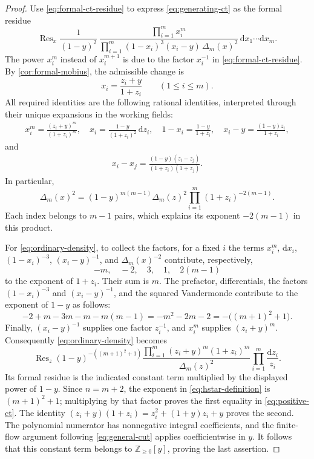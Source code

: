 \documentclass[reqno, 12pt]{article}
\numberwithin{equation}{section}
\theoremstyle{definition}
\DeclareMathOperator{\Res}{Res}
\newcommand{\dd}{\mathrm d}
\begin{document}
\begin{proof}
Use \eqref{eq:formal-ct-residue} to express
\eqref{eq:generating-ct} as the formal residue
\begin{equation}\label{eq:ordinary-density}
\Res_x\frac1{(1-y)^2}\,\frac{\prod_{i=1}^m x_i^m}{\prod_{i=1}^m(1-x_i)^3(x_i-y)\,\Delta_m(x)^2}\,\dd x_1\cdots\dd x_m.
\end{equation}
The power $x_i^m$ instead of $x_i^{m+1}$ is due to the factor
$x_i^{-1}$ in \eqref{eq:formal-ct-residue}.
By \cref{cor:formal-mobius}, the admissible change is
\begin{equation}\label{eq:mobius-substitution}
x_i=\frac{z_i+y}{1+z_i}\qquad(1\leq i\leq m).
\end{equation}
All required identities are the following rational identities,
interpreted through their unique expansions in the working fields:
\begin{align*}
x_i^m=\frac{(z_i+y)^m}{(1+z_i)^m},\quad x_i=\frac{1-y}{(1+z_i)^2}\,\dd z_i,\quad
1-x_i=\frac{1-y}{1+z_i},\quad
x_i-y=\frac{(1-y)z_i}{1+z_i},
\end{align*}
and 
\begin{align*}
x_i-x_j=\frac{(1-y)(z_i-z_j)}{(1+z_i)(1+z_j)}.
\end{align*}
In particular,
\[
\Delta_m(x)^2
 =(1-y)^{m(m-1)}\Delta_m(z)^2
       \prod_{i=1}^m(1+z_i)^{-2(m-1)}.
\]
Each index belongs to $m-1$ pairs, which explains its exponent
$-2(m-1)$ in this product.

For \eqref{eq:ordinary-density}, to collect the factors, for a fixed $i$ the terms $x_i^m$, $\dd x_i$,
$(1-x_i)^{-3}$, $(x_i-y)^{-1}$, and $\Delta_m(x)^{-2}$
contribute, respectively,
\[
-m,\quad -2,\quad 3,\quad 1,\quad 2(m-1)
\]
to the exponent of $1+z_i$.  Their sum is $m$.  The prefactor, differentials, the factors $(1-x_i)^{-3}$ and
$(x_i-y)^{-1}$, and the squared Vandermonde contribute to the
exponent of $1-y$ as follows:
\[
-2+m-3m-m-m(m-1)
 =-m^2-2m-2=-\bigl((m+1)^2+1\bigr).
\]
Finally, $(x_i-y)^{-1}$ supplies one factor $z_i^{-1}$,
and $x_i^m$ supplies $(z_i+y)^m$.  Consequently
\eqref{eq:ordinary-density} becomes
\[\Res_z (1-y)^{-((m+1)^2+1)}\frac{\prod_{i=1}^m(z_i+y)^m(1+z_i)^m}{\Delta_m(z)^2}\prod_{i=1}^m\frac{\dd z_i}{z_i}.
\]
Its formal residue is the indicated constant term multiplied
by the displayed power of $1-y$.
Since $n=m+2$, the exponent in
\eqref{eq:hstar-definition} is $(m+1)^2+1$; multiplying by
that factor proves the first equality in
\eqref{eq:positive-ct}.  The identity
$(z_i+y)(1+z_i)=z_i^2+(1+y)z_i+y$ proves the second.
The polynomial numerator has nonnegative integral coefficients, and the finite-flow argument following \eqref{eq:general-cut} applies coefficientwise in $y$. It follows that this constant term belongs to $\mathbb Z_{\geq0}[y]$, proving the last assertion.
\end{proof}
\end{document}

